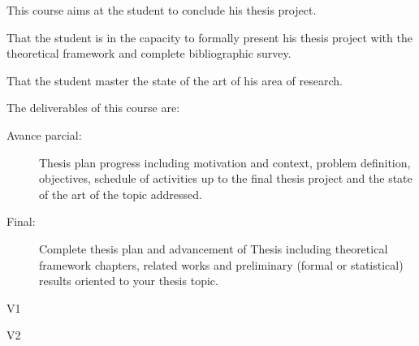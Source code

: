 \begin{syllabus}


\begin{justification}
This course aims at the student to conclude his thesis project.
\end{justification}

\begin{goals}
\item That the student is in the capacity to formally present his thesis project with the theoretical framework and complete bibliographic survey.
\item That the student master the state of the art of his area of research.
\item The deliverables of this course are:
	\begin{description}
	\item [Avance parcial:] Thesis plan progress including motivation and context, problem definition, objectives, schedule of activities up to the final thesis project and the state of the art of the topic addressed.
	\item [Final:] Complete thesis plan and advancement of Thesis including theoretical framework chapters, related works and preliminary (formal or statistical) results oriented to your thesis topic.
	\end{description}
\end{goals}

\begin{outcomes}{V1}
\item {}
\item {}
\item {}
\item {}
\item {}
\item {}
\item {}
\item {}
\end{outcomes}

\begin{outcomes}{V2}
\item {}
\item {}
\item {}
\item {}
\end{outcomes}


\end{syllabus}
